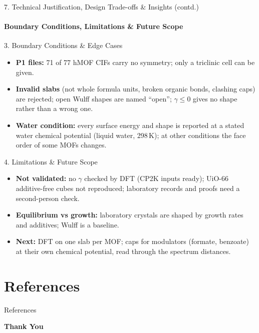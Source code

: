 \documentclass[aspectratio=169, 11pt]{beamer}
\begin{document}
\begin{frame}[shrink=4]{7. Technical Justification, Design Trade-offs \& Insights (contd.)}
    \framesubtitle{Boundary Conditions, Limitations \& Future Scope}
    \scriptsize
    \begin{block}{3. Boundary Conditions \& Edge Cases}
        \begin{itemize}
            \item \textbf{P1 files:} 71 of 77 hMOF CIFs carry no symmetry; only a triclinic cell can be given.
            \item \textbf{Invalid slabs} (not whole formula units, broken organic bonds, clashing caps) are rejected; open Wulff shapes are named ``open''; $\gamma \le 0$ gives no shape rather than a wrong one.
            \item \textbf{Water condition:} every surface energy and shape is reported at a stated water chemical potential (liquid water, 298\,K); at other conditions the face order of some MOFs changes.
        \end{itemize}
    \end{block}
    \begin{block}{4. Limitations \& Future Scope}
        \begin{itemize}
            \item \textbf{Not validated:} no $\gamma$ checked by DFT (CP2K inputs ready); UiO-66 additive-free cubes not reproduced; laboratory records and proofs need a second-person check.
            \item \textbf{Equilibrium vs growth:} laboratory crystals are shaped by growth rates and additives; Wulff is a baseline.
            \item \textbf{Next:} DFT on one slab per MOF; caps for modulators (formate, benzoate) at their own chemical potential, read through the spectrum distances.
        \end{itemize}
    \end{block}
\end{frame}

\section{References}
\nocite{wulff1901,donnay1937,grimbergen1998,chgnet2023,mace2024,deng2024softening,core2019,pymatgen2013,spglib2024,tran2016,rappe1992,chen2020,umemura2011,wilmer2012,reuter2001,janaf1998,gilmer2017,sobol1967}
\begin{frame}[allowframebreaks]{References}
    \scriptsize
    
    
\end{frame}

\begin{frame}
    \centering
    {\Huge \textbf{\textcolor{amritaMaroon}{Thank You}}}
\end{frame}
\end{document}
